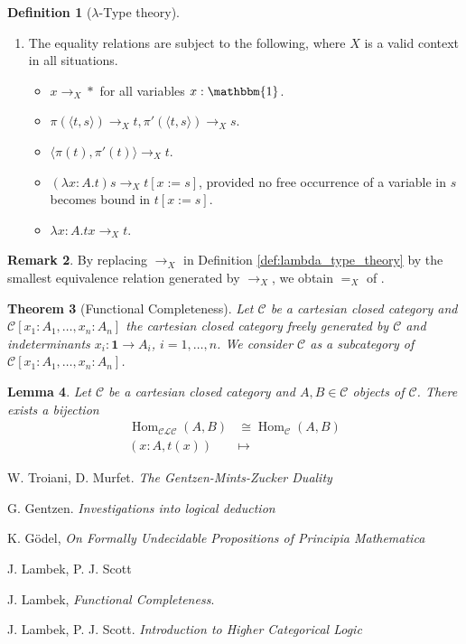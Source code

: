 \documentclass[12pt]{article}
\theoremstyle{plain}
\newtheorem{thm}{Theorem}[subsection] %
\newtheorem{lemma}[thm]{Lemma}
\theoremstyle{definition}
\newtheorem{defn}[thm]{Definition} %
\newtheorem{remark}[thm]{Remark}
\newcommand{\scr}[1]{\mathscr{#1}}
\newcommand{\call}[1]{\mathcal{#1}}
\newcommand{\lto}{\longrightarrow}
\begin{document}
\begin{defn}[$\lambda$-Type theory]
\begin{enumerate}
\begin{itemize}
				\end{itemize}
			\item The equality relations are subject to the following, where $X$ is a valid context in all situations.
			\begin{itemize}
				\item $x \lto_X \ast$ for all variables $x: \mathbbm{1}$.
				\item $\pi(\langle t, s \rangle) \lto_X t, \pi'(\langle t, s \rangle) \lto_X s$.
				\item $\langle \pi(t), \pi'(t) \rangle \lto_X t$.
				\item $(\lambda x:A. t)s \lto_X t[x := s]$, provided no free occurrence of a variable in $s$ becomes bound in $t[x := s]$.
				\item $\lambda x:A. tx \lto_X t$.
			\end{itemize}
			\end{enumerate}
		\end{defn}
	\begin{remark}
		By replacing $\lto_X$ in Definition \ref{def:lambda_type_theory} by the smallest equivalence relation generated by $\lto_X$, we obtain $=_X$ of \cite{Lambek_Scott}.
		\end{remark}
	
	\begin{thm}[Functional Completeness]
		Let $\call{C}$ be a cartesian closed category and $\call{C}[x_1: A_1,\ldots, x_n: A_n]$ the cartesian closed category freely generated by $\call{C}$ and indeterminants $x_i: \textbf{1} \lto A_i$, $i = 1 , \ldots, n$. We consider $\call{C}$ as a subcategory of $\call{C}[x_1:A_1, \ldots, x_n : A_n]$.
		\end{thm}
	
	\begin{lemma}
		Let $\call{C}$ be a cartesian closed category and $A, B \in \call{C}$ objects of $\call{C}$. There exists a bijection
		\begin{align}
			\operatorname{Hom}_{\scr{CL}\call{C}}(A,B) &\cong \operatorname{Hom}_{\call{C}}(A,B)\\
			(x:A, t(x)) &\longmapsto
			\end{align}
		\end{lemma}
	
	
	
	
	
	
	
	\begin{thebibliography}{99}
		 W. Troiani, D. Murfet. \emph{The Gentzen-Mints-Zucker Duality}
		
		 G. Gentzen. \emph{Investigations into logical deduction}
		
		 K. G\"{o}del, \emph{On Formally Undecidable Propositions of Principia Mathematica}
		
		 J. Lambek, P. J. Scott
		
		 J. Lambek, \emph{Functional Completeness}.
		
		 J. Lambek, P. J. Scott. \emph{Introduction to Higher Categorical Logic}
	\end{thebibliography}
	
\end{document}
